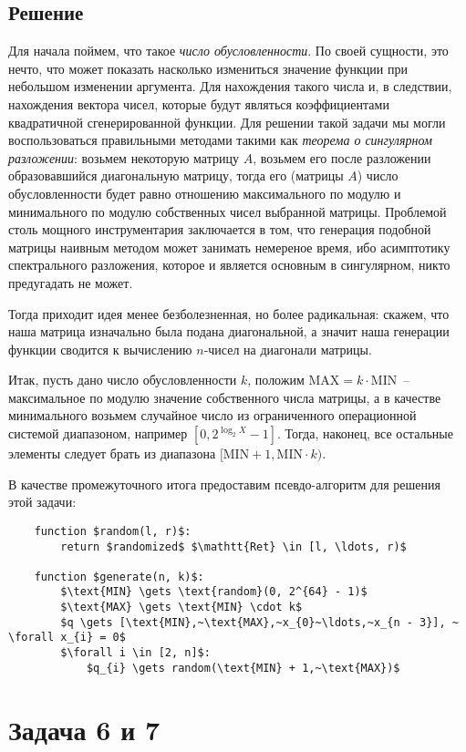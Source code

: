 \documentclass[12pt, a4paper, oneside]{article}
\begin{document}
	\subsection*{Решение}
	Для начала поймем, что такое \textit{число обусловленности}. По своей сущности, это нечто, что может показать насколько измениться значение функции при небольшом изменении аргумента. Для нахождения такого числа и, в следствии, нахождения вектора чисел, которые будут являться коэффициентами квадратичной сгенерированной функции. Для решении такой задачи мы могли воспользоваться правильными методами такими как \textit{теорема о сингулярном разложении}: возьмем некоторую матрицу $A$, возьмем его после разложении образовавшийся диагональную матрицу, тогда его (матрицы $A$) число обусловленности будет равно отношению максимального по модулю и минимального по модулю собственных чисел выбранной матрицы. Проблемой столь мощного инструментария заключается в том, что генерация подобной матрицы наивным методом может занимать немереное время, ибо асимптотику спектрального разложения, которое и является основным в сингулярном, никто предугадать не может.

	Тогда приходит идея менее безболезненная, но более радикальная: скажем, что наша матрица изначально была подана диагональной, а значит наша генерации функции сводится к вычислению $n$-чисел на диагонали матрицы.

	Итак, пусть дано число обусловленности $k$, положим $\text{MAX} = k \cdot \text{MIN}$~-- максимальное по модулю значение собственного числа матрицы, а в качестве минимального возьмем случайное число из ограниченного операционной системой диапазоном, например $[0, 2^{\log_{2}{X}} - 1]$. Тогда, наконец, все остальные элементы следует брать из диапазона $[\text{MIN} + 1, \text{MIN} \cdot k)$.

	В качестве промежуточного итога предоставим псевдо-алгоритм для решения этой задачи:
	\begin{lstlisting}
	function $random(l, r)$:
		return $randomized$ $\mathtt{Ret} \in [l, \ldots, r)$
			
	function $generate(n, k)$:
		$\text{MIN} \gets \text{random}(0, 2^{64} - 1)$
		$\text{MAX} \gets \text{MIN} \cdot k$
		$q \gets [\text{MIN},~\text{MAX},~x_{0}~\ldots,~x_{n - 3}], ~ \forall x_{i} = 0$
		$\forall i \in [2, n]$:
			$q_{i} \gets random(\text{MIN} + 1,~\text{MAX})$
	\end{lstlisting}
	\section*{Задача 6 и 7}
\end{document}
